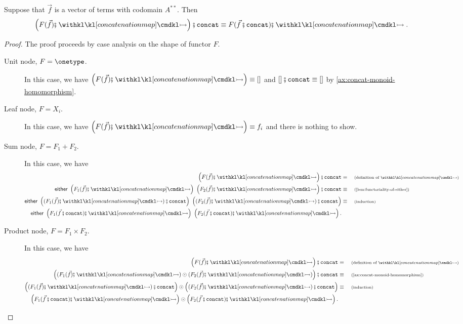 \begin{lemma}\label{lem:concat-map-concat}
    Suppose that $\vec f$ is a vector of terms with codomain $A^{**}$. Then
    \[
        \left( F(\vec f) \comp \concmap \right) \comp \concatterm \equiv F(\vec f \comp \concatterm) \comp \concmap.
    \]
\end{lemma}
\begin{proof}
    The proof proceeds by case analysis on the shape of functor $F$.
    \begin{description}
        \item[Unit node, $F = \onetype$.] In this case, we have $\left( F(\vec f) \comp \concmap \right) \equiv []$ and $[] \comp \concatterm \equiv []$ by \cref{ax:concat-monoid-homomorphism}.

        \item[Leaf node, $F = X_i$.] In this case, we have $\left( F(\vec f) \comp \concmap \right) \equiv f_i$ and there is nothing to show. 
        
        \item[Sum node, $F = F_1 + F_2$.] In this case, we have 
        \begin{align*}
            \left( F(\vec f) \comp \concmap \right) \comp \concatterm &= \why{definition of $\concmap$} \\ 
            \either{\left( F_1(\vec f) \comp \concmap \right)}{\left( F_2(\vec f) \comp \concmap \right)} \comp \concatterm \equalbecause{\cref{lem:functoriality-of-either}} \\ 
            \either{\left( (F_1(\vec f) \comp \concmap) \comp \concatterm \right)}{\left( (F_2(\vec f) \comp \concmap) \comp \concatterm\right)} \equalbecause{induction} \\
            \either{\left( F_1(\vec f \comp \concatterm) \comp \concmap \right)}{\left( F_2(\vec f \comp \concatterm) \comp \concmap \right)}.
        \end{align*}

        \item[Product node, $F = F_1 \times F_2$.] In this case, we have 
        \begin{align*}
            \left( F(\vec f) \comp \concmap \right) \comp \concatterm &= \why{definition of $\concmap$} \\ 
            \left( (F_1(\vec f) \comp \concmap) \odot (F_2(\vec f) \comp \concmap) \right) \comp \concatterm \equalbecause{\cref{ax:concat-monoid-homomorphism}} \\ 
            \left( (F_1(\vec f) \comp \concmap) \comp \concatterm \right) \odot \left( (F_2(\vec f) \comp \concmap) \comp \concatterm \right) \equalbecause{induction} \\
            \left( F_1(\vec f \comp \concatterm) \comp \concmap \right) \odot \left( F_2(\vec f \comp \concatterm) \comp \concmap \right).
        \end{align*}


\end{description}
\end{proof}
